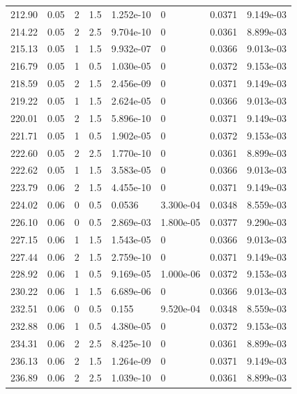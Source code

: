 \documentclass[preview]{standalone}
\begin{document}
{{{{\begin{tabular}{L{1.2cm}C{1.2cm} C{0.3cm}C{0.5cm} C{1.4cm}C{1.4cm} C{1.4cm}C{1.4cm}}
  212.90  &  0.05  & 2     & 1.5 &  1.252e-10  & 0  & 0.0371 &  9.149e-03   \\ 
  214.22  &  0.05  & 2     & 2.5 &  9.704e-10  & 0  & 0.0361 &  8.899e-03   \\ 
  215.13  &  0.05  & 1     & 1.5 &  9.932e-07  & 0  & 0.0366 &  9.013e-03   \\ 
  216.79  &  0.05  & 1     & 0.5 &  1.030e-05  & 0  & 0.0372 &  9.153e-03   \\ 
  218.59  &  0.05  & 2     & 1.5 &  2.456e-09  & 0  & 0.0371 &  9.149e-03   \\ 
  219.22  &  0.05  & 1     & 1.5 &  2.624e-05  & 0  & 0.0366 &  9.013e-03   \\ 
  220.01  &  0.05  & 2     & 1.5 &  5.896e-10  & 0  & 0.0371 &  9.149e-03   \\ 
  221.71  &  0.05  & 1     & 0.5 &  1.902e-05  & 0  & 0.0372 &  9.153e-03   \\ 
  222.60  &  0.05  & 2     & 2.5 &  1.770e-10  & 0  & 0.0361 &  8.899e-03   \\ 
  222.62  &  0.05  & 1     & 1.5 &  3.583e-05  & 0  & 0.0366 &  9.013e-03   \\ 
  223.79  &  0.06  & 2     & 1.5 &  4.455e-10  & 0  & 0.0371 &  9.149e-03   \\ 
  224.02  &  0.06  & 0     & 0.5 &  0.0536  & 3.300e-04  & 0.0348 &  8.559e-03   \\ 
  226.10  &  0.06  & 0     & 0.5 &  2.869e-03  & 1.800e-05  & 0.0377 &  9.290e-03   \\ 
  227.15  &  0.06  & 1     & 1.5 &  1.543e-05  & 0  & 0.0366 &  9.013e-03   \\ 
  227.44  &  0.06  & 2     & 1.5 &  2.759e-10  & 0  & 0.0371 &  9.149e-03   \\ 
  228.92  &  0.06  & 1     & 0.5 &  9.169e-05  & 1.000e-06  & 0.0372 &  9.153e-03   \\ 
  230.22  &  0.06  & 1     & 1.5 &  6.689e-06  & 0  & 0.0366 &  9.013e-03   \\ 
  232.51  &  0.06  & 0     & 0.5 &  0.155  & 9.520e-04  & 0.0348 &  8.559e-03   \\ 
  232.88  &  0.06  & 1     & 0.5 &  4.380e-05  & 0  & 0.0372 &  9.153e-03   \\ 
  234.31  &  0.06  & 2     & 2.5 &  8.425e-10  & 0  & 0.0361 &  8.899e-03   \\ 
  236.13  &  0.06  & 2     & 1.5 &  1.264e-09  & 0  & 0.0371 &  9.149e-03   \\ 
  236.89  &  0.06  & 2     & 2.5 &  1.039e-10  & 0  & 0.0361 &  8.899e-03   \\ 

\end{tabular}}}}}
\end{document}
